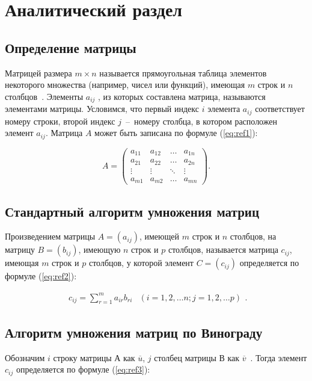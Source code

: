 \chapter{Аналитический раздел}
\section{Определение матрицы}
Матрицей размера $m \times n$ называется прямоугольная таблица элементов некоторого множества 
(например, чисел или функций), имеющая $m$ строк и $n$ столбцов~\cite{angem}.
Элементы $a_{ij}$ , из которых составлена матрица, называются элементами матрицы.
Условимся, что первый индекс $i$ элемента $a_{ij}$
соответствует номеру строки, второй индекс $j$~–~номеру столбца, в котором расположен элемент $a_{ij}$.
Матрица $A$ может быть записана по формуле (\ref{eq:ref1}):

\begin{equation}
	A = \left(
	\begin{array}{cccc}
		a_{11} & a_{12} & \ldots & a_{1n} \\
		a_{21} & a_{22} & \ldots & a_{2n} \\
		\vdots & \vdots & \ddots & \vdots \\
		a_{m1} & a_{m2} & \ldots & a_{mn}
	\end{array}
	\right).
	\label{eq:ref1}
\end{equation}

\section{Стандартный алгоритм умножения матриц}
Произведением матрицы $A = (a_{ij})$, имеющей $m$ строк и $n$ столбцов, на матрицу $B = (b_{ij})$, имеющую
$n$ строк и $p$ столбцов, называется матрица $c_{ij}$, имеющая $m$ строк и $p$ столбцов, у которой элемент 
$C = (c_{ij})$ определяется по формуле (\ref{eq:ref2}):

\begin{equation}
	\begin{array}{cc}
		c_{ij} = \sum\limits_{r=1}^m a_{ir}b_{ri} & (i=1,2,\dots n; j=1,2,\dots p)
	\end{array}.
	\label{eq:ref2}
\end{equation}

\section{Алгоритм умножения матриц по Винограду}
Обозначим $i$ строку матрицы $А$ как  $\overline{u}$, $j$ столбец матрицы $В$ как $\overline{v}$~\cite{winograd-origin}. Тогда элемент $c_{ij}$ определяется по формуле (\ref{eq:ref3}):

